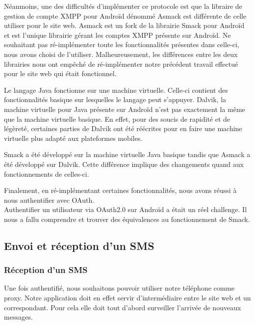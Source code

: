 Néanmoins, une des difficultés d'implémenter ce protocole est que la libraire de gestion de compte
XMPP pour Androïd dénommé Asmack est différente de celle utiliser pour le site web. Asmack est un fork 
de la librairie Smack pour Androïd et est l'unique librairie gérant les comptes XMPP présente sur
Androïd. Ne souhaitant pas ré-implémenter toute les fonctionnalités présentes dans celle-ci, nous avons
choisi de l'utiliser. Malheureusement, les différences entre les deux librairies nous ont empêché de 
ré-implémenter notre précédent travail effectué pour le site web qui était fonctionnel. 

Le langage Java fonctionne sur une machine virtuelle. Celle-ci contient des fonctionnalités basique sur
lesquelles le langage peut s'appuyer. Dalvik, la machine virtuelle pour Java présente sur Androïd n'est 
pas exactement la même que la machine virtuelle basique. En effet, pour des soucis de rapidité et de 
légèreté, certaines parties de Dalvik ont été réécrites pour en faire une machine virtuelle plus adapté
aux plateformes mobiles.

Smack a été développé sur la machine virtuelle Java basique tandis que Asmack a été développé sur Dalvik.
Cette différence implique des changements quand aux fonctionnements de celles-ci. 

Finalement, en ré-implémentant certaines fonctionnalités, nous avons réussi à nous authentifier avec OAuth.
\\


Authentifier un utilisateur via OAuth2.0 sur Androïd a était un réel challenge. Il nous a fallu comprendre 
et trouver des équivalences au fonctionnement de Smack. 
\\



\subsection{Envoi et réception d'un SMS}


\subsubsection{Réception d'un SMS}

Une fois authentifié, nous souhaitons pouvoir utiliser notre téléphone comme proxy. Notre application
doit en effet servir d'intermédiaire entre le site web et un correspondant. Pour cela elle doit tout
d'abord surveiller l'arrivée de nouveaux messages. 

